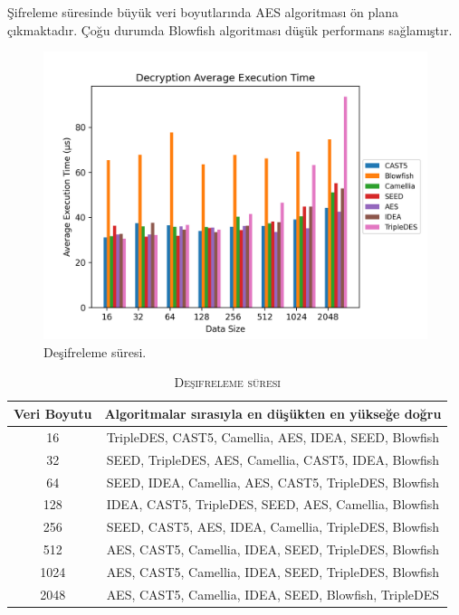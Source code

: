 \documentclass[conference, a4paper]{IEEEtran}
\begin{document}
    Şifreleme süresinde büyük veri boyutlarında AES algoritması ön plana çıkmaktadır. Çoğu durumda Blowfish algoritması düşük performans sağlamıştır.

    \begin{figure}[H]
    \centering
    \shorthandoff{=}  
    \includegraphics[scale=0.52]{fig8.png}
    \shorthandon{=} 
    \caption{Deşifreleme süresi.}
    \label{sekil8}
    \end{figure}

    \begin{table}[h]
        \centering
        \caption{\textsc{Deşifreleme süresi}}
        \label{tablo5}
        \begin{tabular}{|c|c|}
            \hline
                Veri Boyutu & Algoritmalar sırasıyla en düşükten en yükseğe doğru \\
            \hline
            16 & TripleDES, CAST5, Camellia, AES, IDEA, SEED, Blowfish \\
            \hline
            32 & SEED, TripleDES, AES, Camellia, CAST5, IDEA, Blowfish \\
            \hline
            64 & SEED, IDEA, Camellia, AES, CAST5, TripleDES, Blowfish \\
            \hline
            128 & IDEA, CAST5, TripleDES, SEED, AES, Camellia, Blowfish \\
            \hline
            256 & SEED, CAST5, AES, IDEA, Camellia, TripleDES, Blowfish \\
            \hline
            512 & AES, CAST5, Camellia, IDEA, SEED, TripleDES, Blowfish \\
            \hline
            1024 & AES, CAST5, Camellia, IDEA, SEED, TripleDES, Blowfish \\
            \hline
            2048 & AES, CAST5, Camellia, IDEA, SEED, Blowfish, TripleDES \\
            \hline
        \end{tabular}
    \end{table}    
\end{document}
